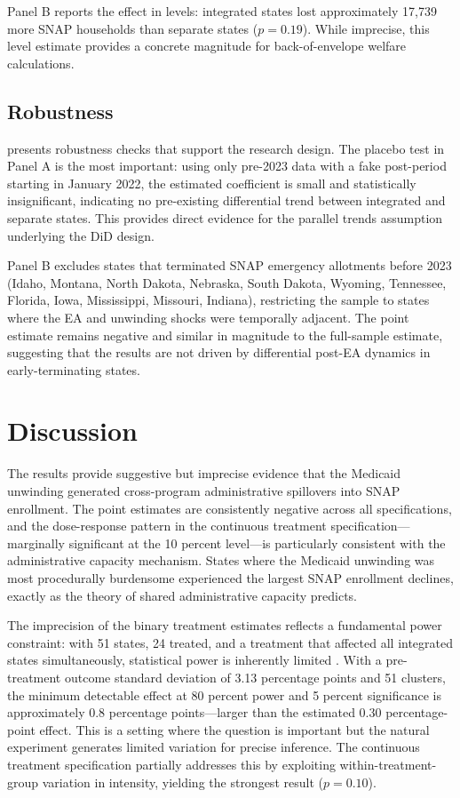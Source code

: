 \documentclass[12pt]{article}
\begin{document}
Panel B reports the effect in levels: integrated states lost approximately 17,739 more SNAP households than separate states ($p = 0.19$). While imprecise, this level estimate provides a concrete magnitude for back-of-envelope welfare calculations.

\subsection{Robustness}



 presents robustness checks that support the research design. The placebo test in Panel A is the most important: using only pre-2023 data with a fake post-period starting in January 2022, the estimated coefficient is small and statistically insignificant, indicating no pre-existing differential trend between integrated and separate states. This provides direct evidence for the parallel trends assumption underlying the DiD design.

Panel B excludes states that terminated SNAP emergency allotments before 2023 (Idaho, Montana, North Dakota, Nebraska, South Dakota, Wyoming, Tennessee, Florida, Iowa, Mississippi, Missouri, Indiana), restricting the sample to states where the EA and unwinding shocks were temporally adjacent. The point estimate remains negative and similar in magnitude to the full-sample estimate, suggesting that the results are not driven by differential post-EA dynamics in early-terminating states.


\section{Discussion}

The results provide suggestive but imprecise evidence that the Medicaid unwinding generated cross-program administrative spillovers into SNAP enrollment. The point estimates are consistently negative across all specifications, and the dose-response pattern in the continuous treatment specification---marginally significant at the 10 percent level---is particularly consistent with the administrative capacity mechanism. States where the Medicaid unwinding was most procedurally burdensome experienced the largest SNAP enrollment declines, exactly as the theory of shared administrative capacity predicts.

The imprecision of the binary treatment estimates reflects a fundamental power constraint: with 51 states, 24 treated, and a treatment that affected all integrated states simultaneously, statistical power is inherently limited \citep{bertrand2004}. With a pre-treatment outcome standard deviation of 3.13 percentage points and 51 clusters, the minimum detectable effect at 80 percent power and 5 percent significance is approximately 0.8 percentage points---larger than the estimated 0.30 percentage-point effect. This is a setting where the question is important but the natural experiment generates limited variation for precise inference. The continuous treatment specification partially addresses this by exploiting within-treatment-group variation in intensity, yielding the strongest result ($p = 0.10$).
\end{document}

